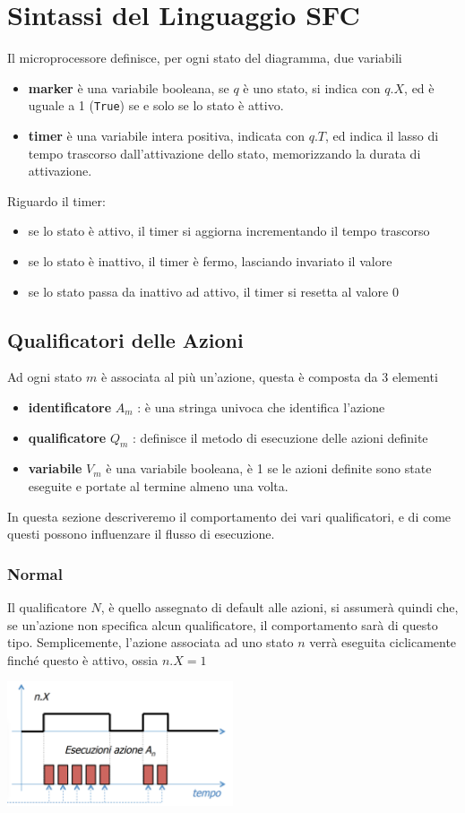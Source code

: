 \documentclass[10pt, letterpaper]{report}
\begin{document}
\section{Sintassi del Linguaggio SFC}
Il microprocessore definisce, per ogni stato del diagramma, due variabili\begin{itemize}
    \item \textbf{marker} è una variabile booleana, se $q$ è uno stato, si indica con $q.X$, ed è uguale a 1 (\texttt{True}) se e solo se lo stato è attivo. 
    \item \textbf{timer} è una variabile intera positiva, indicata con $q.T$, ed indica il lasso di tempo trascorso dall'attivazione dello stato, memorizzando la durata di attivazione.
\end{itemize}
Riguardo il timer:\begin{itemize}
    \item se lo stato è attivo, il timer si aggiorna incrementando il tempo trascorso 
    \item se lo stato è inattivo, il timer è fermo, lasciando invariato il valore 
    \item se lo stato passa da inattivo ad attivo, il timer si resetta al valore 0
\end{itemize}
\subsection{Qualificatori delle Azioni}
Ad ogni stato $m$ è associata al più un'azione, questa è composta da 3 elementi\begin{itemize}
    \item \textbf{identificatore} $A_m$ : è una stringa univoca che identifica l'azione 
    \item \textbf{qualificatore} $Q_m$ : definisce il metodo di esecuzione delle azioni definite 
    \item \textbf{variabile} $V_m$ è una variabile booleana, è 1 se le azioni definite sono state eseguite e portate al termine almeno una volta.
\end{itemize}
In questa sezione descriveremo il comportamento dei vari qualificatori, e di come questi possono influenzare il flusso di esecuzione.
\subsubsection{Normal}
Il qualificatore $N$, è quello assegnato di default alle azioni, si assumerà quindi che, se un'azione non specifica alcun qualificatore, il comportamento sarà di questo tipo. Semplicemente, l'azione associata ad uno stato $n$ verrà eseguita ciclicamente finché questo è attivo, ossia $n.X=1$
\begin{center}
    \includegraphics[width=0.5\textwidth ]{images/normalQual.png}
\end{center}
\end{document}
